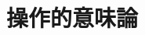 \documentclass{jsarticle}
\newcommand{\semantics}[1]{[\![ #1 ]\!]}
\begin{document}

\newpage

\section{操作的意味論}
\end{document}
